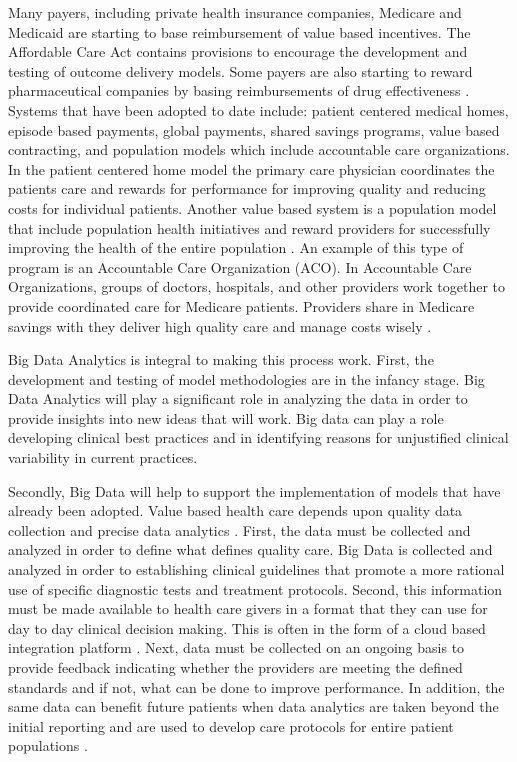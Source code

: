 \documentclass[sigconf]{acmart}
\begin{document}
Many payers, including private health insurance companies, Medicare and Medicaid are starting to base reimbursement of value based incentives. The Affordable Care Act contains provisions to encourage the development and testing of outcome delivery models.  Some payers are also starting to reward pharmaceutical companies by basing reimbursements of drug effectiveness \cite{www-google-McKinsey}. 
 Systems that have been adopted to date include: patient centered medical homes, episode based payments, global payments, shared savings programs, value based contracting, and population models which include accountable care organizations.  In the patient centered home model the primary care physician coordinates the patients care and rewards for performance for improving quality and reducing costs for individual patients. Another value based system is a population model that include population health initiatives and reward providers for successfully improving the health of the entire population \cite{www-google-liason}. An example of this type of program is an Accountable Care Organization (ACO). In Accountable Care Organizations, groups of doctors, hospitals, and other providers work together to provide coordinated care for Medicare patients. Providers share in Medicare savings with they deliver high quality care and manage costs wisely \cite{www-google-ACO}.
 
Big Data Analytics is integral to making this process work. First, the development and testing of model methodologies are in the infancy stage. Big Data Analytics will play a significant role in analyzing the data in order to provide insights into new ideas that will work. Big data can play a role developing clinical best practices and in identifying reasons for unjustified clinical variability in current practices.

Secondly, Big Data will help to support the implementation of models that have already been adopted. Value based health care depends upon quality data collection and precise data analytics \cite{www-google-liason}.  First, the data must be collected and analyzed in order to define what defines quality care. Big Data is collected and analyzed in order to establishing clinical guidelines that promote a more rational use of specific diagnostic tests and treatment protocols.  Second, this information must be made available to health care givers in a format that they can use for day to day clinical decision making. This is often in the form of a cloud based integration platform \cite{www-google-liason}.  Next, data must be collected on an ongoing basis to provide feedback indicating whether the providers are meeting the defined standards and if not, what can be done to improve performance. In addition, the same data can benefit future patients when data analytics are taken beyond the initial reporting and are used to develop care protocols for entire patient populations \cite{www-google-liason}. 
\end{document}
